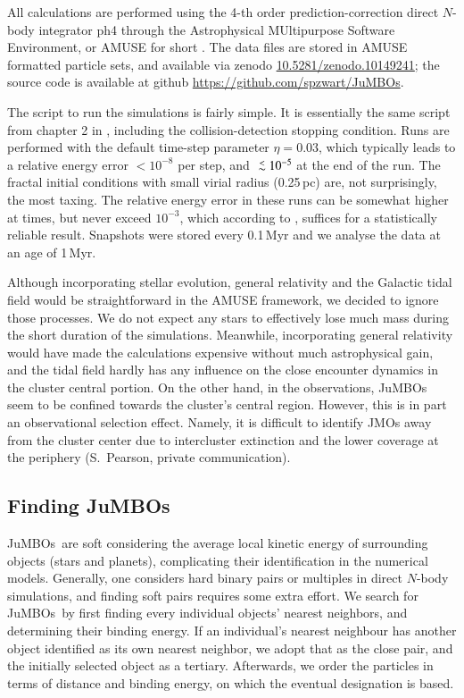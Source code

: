 \documentclass[submission,phys]{lib/SciPost}
\def\aplt{\ {\raise-.5ex\hbox{$\buildrel<\over\sim$}}\ }
\newcommand{\jumbos}{\mbox{JuMBOs}}
\begin{document}
All calculations are performed using the 4-th order prediction-correction
direct $N$-body integrator {\sc ph4} \cite{2022A&A...659A..86P}
through the Astrophysical MUltipurpose Software Environment, or AMUSE
for short
\cite{2013CoPhC.183..456P,2013AA...557A..84P,2018araa.book.....P}.
The data files are stored in {\sc AMUSE} formatted particle sets, and
available via zenodo \url{10.5281/zenodo.10149241}; the source
code is available at github \url{https://github.com/spzwart/JuMBOs}.

The script to run the simulations is fairly simple.  It is essentially
the same script from chapter 2 in \cite{2018araa.book.....P},
including the collision-detection stopping condition.  Runs are
performed with the default time-step parameter $\eta=0.03$, which
typically leads to a relative energy error $<10^{-8}$ per step, and
$\aplt 10^{-5}$ at the end of the run. The fractal initial conditions
with small virial radius (0.25\,pc) are, not surprisingly, the most
taxing.  The relative energy error in these runs can be somewhat
higher at times, but never exceed $10^{-3}$, which according to
\cite{2041-8205-785-1-L3}, suffices for a statistically reliable
result.  Snapshots were stored every 0.1\,Myr and we analyse the data
at an age of 1\,Myr.

Although incorporating stellar evolution, general relativity and the
Galactic tidal field would be straightforward in the AMUSE framework,
we decided to ignore those processes.  We do not expect any stars to
effectively lose much mass during the short duration of the
simulations. Meanwhile, incorporating general relativity would have made the
calculations expensive without much astrophysical gain, and the tidal
field hardly has any influence on the close encounter dynamics in the
cluster central portion.  On the other hand, in the observations,
\jumbos\, seem to be confined towards the cluster's central region.
However, this is in part an observational selection effect. Namely, it is
difficult to identify JMOs away from the cluster center due to intercluster 
extinction and the lower coverage at the periphery (S.\, Pearson, 
private communication).

\subsection{Finding \jumbos}

\jumbos\, are soft considering the average local kinetic energy of
surrounding objects (stars and planets), complicating their identification
in the numerical models.  Generally, one considers hard
binary pairs or multiples in direct $N$-body simulations, and finding
soft pairs requires some extra effort.  We search for \jumbos\,
by first finding every individual objects' nearest neighbors, 
and determining their binding energy. If an individual's nearest
neighbour has another object identified as its own nearest neighbor, we
adopt that as the close pair, and the initially selected object as
a tertiary. Afterwards, we order the particles in terms of distance and
binding energy, on which the eventual designation is based.
\end{document}
